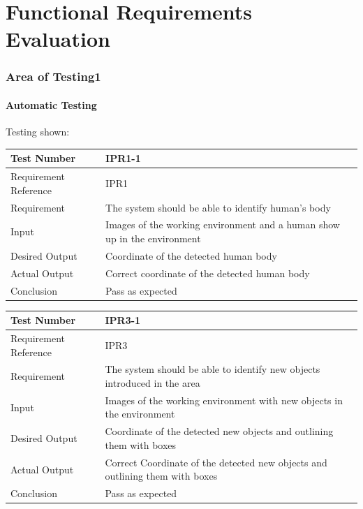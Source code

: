 \documentclass[12pt, titlepage]{article}
\begin{document}
\section{Functional Requirements Evaluation}

\subsubsection{Area of Testing1}
		
\paragraph{Automatic Testing}{Testing shown:}
\begin{table}[H]
\begin{center}
\begin{tabular}{|l | m{9cm}|}
\hline
  Test Number & IPR1-1\\
  \hline
  Requirement Reference & IPR1\\
  \hline
  Requirement &  The system should be able to identify human’s body\\
  \hline
  Input & Images of the working environment and a human show up in
the environment\\
  \hline
  Desired Output & Coordinate of the detected human body\\
  \hline
  Actual Output & Correct coordinate of the detected human body\\
  \hline
  Conclusion & Pass as expected\\
  \hline
\end{tabular}
\end{center}           
\end{table}


\begin{table}[H]
\begin{center}
\begin{tabular}{|l | m{9cm}|}
\hline
  Test Number & IPR3-1\\
  \hline
  Requirement Reference & IPR3\\
  \hline
  Requirement &  The system should be able to identify new objects introduced in the area\\
  \hline
  Input & Images of the working environment with new objects in the environment\\
  \hline
  Desired Output & Coordinate of the detected new objects and outlining them with boxes\\
  \hline
  Actual Output & Correct Coordinate of the detected new objects and outlining them with boxes\\
  \hline
  Conclusion & Pass as expected\\
  \hline
\end{tabular}
\end{center}           
\end{table}
\end{document}
